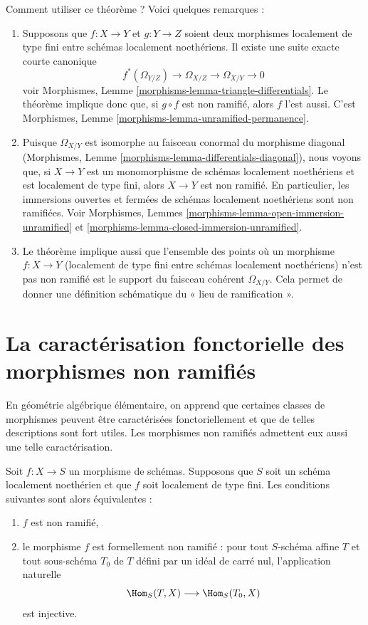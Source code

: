 \noindent
Comment utiliser ce théorème ? Voici quelques remarques :
\begin{enumerate}
\item Supposons que
$f : X \to Y$ et $g : Y \to Z$ soient deux morphismes localement de type
fini entre schémas localement noethériens. Il existe une
suite exacte courte canonique
$$
f^*(\Omega_{Y/Z}) \to \Omega_{X/Z} \to \Omega_{X/Y} \to 0
$$
voir Morphismes, Lemme \ref{morphisms-lemma-triangle-differentials}.
Le théorème implique donc que, si $g \circ f$ est non ramifié,
alors $f$ l'est aussi. C'est
Morphismes, Lemme \ref{morphisms-lemma-unramified-permanence}.
\item Puisque $\Omega_{X/Y}$ est isomorphe au faisceau conormal
du morphisme diagonal
(Morphismes, Lemme \ref{morphisms-lemma-differentials-diagonal}),
nous voyons que, si $X \to Y$ est un monomorphisme de
schémas localement noethériens et est localement de type fini,
alors $X \to Y$ est non ramifié.
En particulier, les immersions ouvertes et fermées de schémas localement noethériens
sont non ramifiées. Voir
Morphismes, Lemmes
\ref{morphisms-lemma-open-immersion-unramified} et
\ref{morphisms-lemma-closed-immersion-unramified}.
\item Le théorème implique aussi que l'ensemble des points
où un morphisme $f : X \to Y$ (localement de type fini entre schémas localement
noethériens) n'est pas non ramifié est
le support du faisceau cohérent $\Omega_{X/Y}$.
Cela permet de donner une définition schématique du
« lieu de ramification ».
\end{enumerate}

\section{La caractérisation fonctorielle des morphismes non ramifiés}
\label{section-functorial-unramified}

\noindent
En géométrie algébrique élémentaire, on apprend que certaines classes de morphismes peuvent être
caractérisées fonctoriellement et que de telles descriptions sont fort utiles.
Les morphismes non ramifiés admettent eux aussi une telle caractérisation.

\begin{theorem}
\label{theorem-formally-unramified}
Soit $f : X \to S$ un morphisme de schémas.
Supposons que $S$ soit un schéma localement noethérien et que $f$ soit localement de type fini.
Les conditions suivantes sont alors équivalentes :
\begin{enumerate}
\item $f$ est non ramifié,
\item le morphisme $f$ est formellement non ramifié :
pour tout $S$-schéma affine $T$ et tout sous-schéma $T_0$ de $T$
défini par un idéal de carré nul,
l'application naturelle
$$
\Hom_S(T, X) \longrightarrow \Hom_S(T_0, X)
$$
est injective.
\end{enumerate}
\end{theorem}

